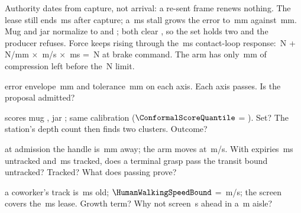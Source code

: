 \documentclass{studysheet}
\begin{document}
\begin{rightcol}
%
  {Authority dates from capture, not arrival: a re-sent frame renews nothing. The lease still ends
   \,ms after capture; a \,ms stall grows the error to \,mm against \,mm.}{}
%
  {Mug  and jar  normalize to  and ; both clear
   , so the set holds two and the producer refuses.}{}
%
  {Force keeps rising through the \,ms contact-loop response: \,N + \,N/mm
   $\times$ \,m/s $\times$ \,ms = \,N at brake command. The arm has only \,mm
   of compression left before the \,N limit.}{}

\vspace{2pt}
\begin{qs}
\item \assumed{} error envelope \,mm and tolerance \,mm on each axis. Each axis passes. Is the proposal admitted?
\item \assumed{} scores mug , jar ; same calibration ($\ConformalScoreQuantile$ =
  ). Set? The station's depth count then finds two clusters. Outcome?
\item \assumed{} at admission the handle is \,mm away; the arm moves at \,m/s. With expiries
  \,ms untracked and \,ms tracked, does a terminal grasp pass the transit bound untracked? Tracked? What does passing prove?
\item \assumed{} a coworker's track is \,ms old; $\HumanWalkingSpeedBound$ = \,m/s; the
  screen covers the \,ms lease. Growth term? Why not screen \,s ahead in a \,m aisle?
\end{qs}
\end{rightcol}
\end{document}
